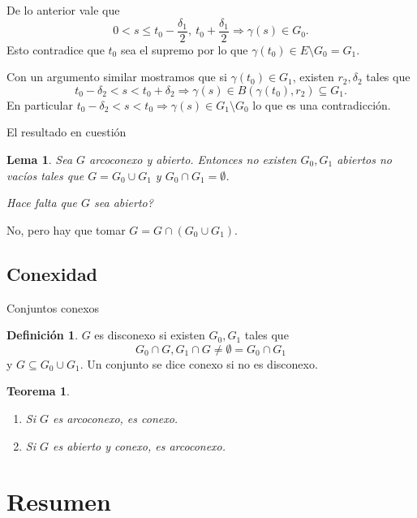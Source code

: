 \documentclass[utf8]{beamer}
\theoremstyle{plain}
\newtheorem{Th}{Teorema}               %
\newtheorem{Lem}{Lema}                 %
\theoremstyle{definition}
\newtheorem{Def}{Definición}           %
\theoremstyle{remark}
\numberwithin{equation}{section}
\newcommand{\dl}{\delta}                %
\newcommand{\ga}{\gamma}                %
\renewcommand{\leq}{\leqslant}          %
\newcommand{\less}{\setminus}           %
\newcommand{\To}{\Rightarrow}
\begin{document}
\begin{frame}
    De lo anterior vale que 
    $$0<s\leq t_0-\frac{\dl_1}{2},\ t_0+\frac{\dl_1}{2}\To \ga(s)\in G_0.$$
    Esto contradice que $t_0$ sea el supremo por lo que $\ga(t_0)\in E\less G_0=G_1$.\par 
    Con un argumento similar mostramos que si $\ga(t_0)\in G_1$, existen $r_2, \dl_2$ tales que 
    $$t_0-\dl_2<s<t_0+\dl_2\To \ga(s)\in B(\ga(t_0),r_2)\subseteq G_1.$$
    En particular $t_0-\dl_2<s<t_0\To \ga(s)\in G_1\less G_0$ lo que es una contradicción.
\end{frame}

\begin{frame}{El resultado en cuestión}
    \begin{Lem}
        Sea $G$ arcoconexo y abierto. Entonces no existen $G_0, G_1$ abiertos no vac\'ios tales que $G=G_0\cup G_1$ y $G_0\cap G_1=\emptyset$.
    \end{Lem}

    \begin{center}
        \emph{Hace falta que $G$ sea abierto?}
    \end{center}
    No, pero hay que tomar $G=G\cap (G_0\cup G_1)$.
\end{frame}

\subsection{Conexidad}

\begin{frame}{Conjuntos conexos
}
    \begin{Def}
        $G$ es \alert{disconexo} si existen $G_0,G_1$ tales que 
        $$G_0\cap G, G_1\cap G\neq\emptyset = G_0\cap G_1$$
        y $G\subseteq G_0\cup G_1$. Un conjunto se dice \alert{conexo} si no es disconexo.
    \end{Def}
    \begin{Th}
        \begin{enumerate}
            \item Si $G$ es arcoconexo, es conexo.
            \item Si $G$ es abierto y conexo, es arcoconexo.
        \end{enumerate}
    \end{Th}
\end{frame}
\section*{Resumen}
\end{document}
